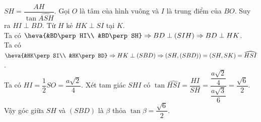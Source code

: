 \begin{ex}
{\begin{itemchoice}
			$SH=\dfrac{AH}{\tan\widehat{ASH}}$. 
			\itemch 
			Gọi $O$ là tâm của hình vuông và $I$ là  trung điểm của $BO$. Suy ra $HI\perp BD$. Từ $H$ kẻ $HK\perp SI$ tại $K$. \\
			Ta  có $\heva{&BD\perp HI\\
			&BD\perp SH} \Rightarrow BD\perp (SIH)\Rightarrow BD\perp  HK$. \\
			Ta  có $\heva{&HK\perp SI\\
			 &HK\perp BD} \Rightarrow HK\perp (SBD)\Rightarrow (SH,(SBD))=(SH,SK)=\widehat{HSI}$. \\
			Ta có $HI=\dfrac{1}{2} SO=\dfrac{a\sqrt{2}}{4}$. Xét tam giác $SHI$  có $\tan \widehat{HSI}=\dfrac{HI}{SH}=\dfrac{\dfrac{a\sqrt{2}}{4}}{\dfrac{a\sqrt{3}}{6}}=\dfrac{\sqrt{6}}{2}$. \\
			Vậy góc giữa $SH$ và  $(SBD)$ là $\beta$ thỏa $\tan \beta=\dfrac{\sqrt{6}}{2}$.
		\end{itemchoice}
	 }
\end{ex}

